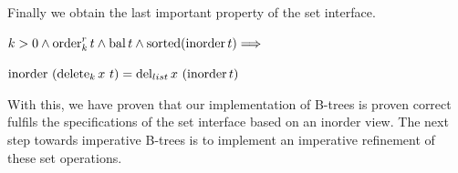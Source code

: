 Finally we obtain the last important property of the set interface.
\begin{theorem}
    $k > 0 \wedge \operatorname{order}^r_k t \wedge \operatorname{bal} t \wedge \operatorname{sorted}  (\operatorname{inorder} t)\Longrightarrow$\\
    \begin{center}
    $\operatorname{inorder}\ (\operatorname{delete}_k x\ t) = \operatorname{del}_{list} x\ (\operatorname{inorder} t)$
    \end{center}
\end{theorem}

With this, we have proven that 
our implementation of B-trees is proven correct
fulfils the specifications of the set interface based on an inorder view.
The next step towards imperative B-trees is to implement
an imperative refinement of these set operations.
